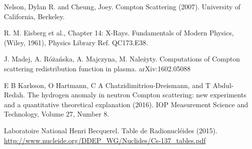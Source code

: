 \documentclass[%
 reprint,
 amsmath,amssymb,
 aps,
 pra,
]{revtex4-1}
\begin{document}
\begin{thebibliography}{6}
	Nelson, Dylan R. and  Cheung, Joey. Compton Scattering (2007). University of California,  Berkeley.
	
	R. M. Eisberg et al., Chapter 14: X-Rays. Fundamentals of Modern Physics,  (Wiley, 1961), Physics Library Ref. QC173.E38.
	
	J. Madej, A. Różańska, A. Majczyna, M. Należyty. Computations of Compton scattering redistribution function in plasma. arXiv:1602.05088
	
	E B Karlsson, O Hartmann, C A Chatzidimitriou-Dreismann, and T Abdul-Redah. The hydrogen anomaly in neutron Compton scattering: new experiments and a quantitative theoretical explanation (2016). IOP Measurement Science and Technology, Volume 27, Number 8.

	Laboratoire National Henri Becquerel. Table de Radionucléides (2015). \url{http://www.nucleide.org/DDEP_WG/Nuclides/Cs-137_tables.pdf}


\end{thebibliography}
\end{document}
